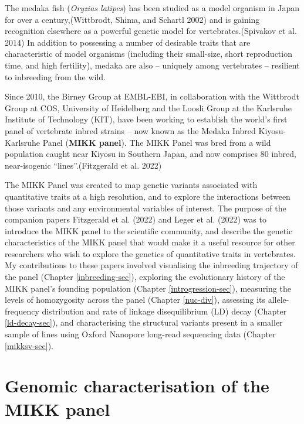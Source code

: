 \documentclass[
]{book}
\begin{document}
The medaka fish (\emph{Oryzias latipes}) has been studied as a model organism in Japan for over a century,(Wittbrodt, Shima, and Schartl 2002) and is gaining recognition elsewhere as a powerful genetic model for vertebrates.(Spivakov et al. 2014) In addition to possessing a number of desirable traits that are characteristic of model organisms (including their small-size, short reproduction time, and high fertility), medaka are also -- uniquely among vertebrates -- resilient to inbreeding from the wild.

Since 2010, the Birney Group at EMBL-EBI, in collaboration with the Wittbrodt Group at COS, University of Heidelberg and the Loosli Group at the Karlsruhe Institute of Technology (KIT), have been working to establish the world's first panel of vertebrate inbred strains -- now known as the Medaka Inbred Kiyosu-Karlsruhe Panel (\textbf{MIKK panel}). The MIKK Panel was bred from a wild population caught near Kiyosu in Southern Japan, and now comprises 80 inbred, near-isogenic ``lines''.(Fitzgerald et al. 2022)

The MIKK Panel was created to map genetic variants associated with quantitative traits at a high resolution, and to explore the interactions between those variants and any environmental variables of interest. The purpose of the companion papers Fitzgerald et al. (2022) and Leger et al. (2022) was to introduce the MIKK panel to the scientific community, and describe the genetic characteristics of the MIKK panel that would make it a useful resource for other researchers who wish to explore the genetics of quantitative traits in vertebrates. My contributions to these papers involved visualising the inbreeding trajectory of the panel (Chapter \ref{inbreeding-sec}),
exploring the evolutionary history of the MIKK panel's founding population (Chapter \ref{introgression-sec}), measuring the levels of homozygosity across the panel (Chapter \ref{nuc-div}), assessing its allele-frequency distribution and rate of linkage disequilibrium (LD) decay (Chapter \ref{ld-decay-sec}), and characterising the structural variants present in a smaller sample of lines using Oxford Nanopore long-read sequencing data (Chapter \ref{mikksv-sec}).

\hypertarget{genomic-characterisation-of-the-mikk-panel}{%
\section{Genomic characterisation of the MIKK panel}\label{genomic-characterisation-of-the-mikk-panel}}
\end{document}
